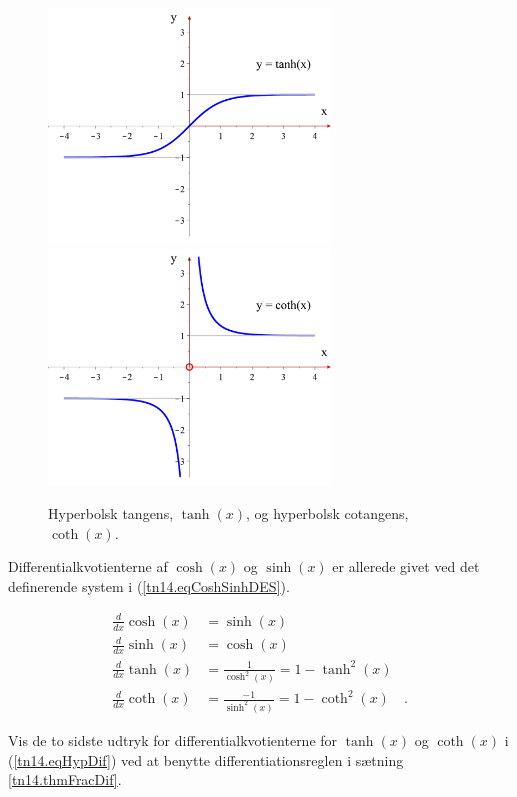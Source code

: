 \begin{figure}[h]
\centerline{\includegraphics[width=75mm]{FIGS/plottanh.pdf} \quad \quad \includegraphics[width=75mm]{FIGS/plotcoth.pdf}}
\begin{center}
\caption{Hyperbolsk tangens, $\tanh(x)$, og hyperbolsk cotangens, $\coth(x)$.} \label{tn14.figplotTanhCoth}
\end{center}
\end{figure}




Differentialkvotienterne af $\cosh(x)$ og $\sinh(x)$ er allerede givet ved det definerende
system i (\ref{tn14.eqCoshSinhDES}).

\begin{equation} \label{tn14.eqHypDif}
\begin{aligned}
\frac{d}{dx}\cosh(x) &= \sinh(x) \\
\frac{d}{dx}\sinh(x) &= \cosh(x) \\
\frac{d}{dx}\tanh(x) &= \frac{1}{\cosh^{2}(x)} = 1 - \tanh^{2}(x) \\
\frac{d}{dx}\coth(x) &= \frac{-1}{\sinh^{2}(x)} = 1 - \coth^{2}(x) \quad .
\end{aligned}
\end{equation}

\begin{exercise}
Vis de to sidste udtryk for differentialkvotienterne for $\tanh(x)$ og $\coth(x)$ i (\ref{tn14.eqHypDif}) ved at benytte differentiationsreglen i sætning \ref{tn14.thmFracDif}.
\end{exercise}

